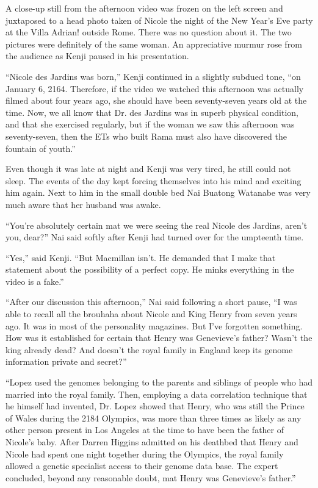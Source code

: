 \documentclass[]{article}
\begin{document}
{A close-up still from the afternoon video was frozen on the left screen and juxtaposed to a head photo taken of Nicole the night of the New Year’s Eve party at the Villa Adrian! outside Rome.  There was no question about it.  The two pictures were definitely of the same woman.  An appreciative murmur rose from the audience as Kenji paused in his presentation.

“Nicole des Jardins was born,” Kenji continued in a slightly subdued tone, “on January 6, 2164.  Therefore, if the video we watched this afternoon was actually filmed about four years ago, she should have been seventy-seven years old at the time.  Now, we all know that Dr.  des Jardins was in superb physical condition, and that she exercised regularly, but if the woman we saw this afternoon was seventy-seven, then the ETs who built Rama must also have discovered the fountain of youth.”

Even though it was late at night and Kenji was very tired, he still could not sleep.  The events of the day kept forcing themselves into his mind and exciting him again.  Next to him in the small double bed Nai Buatong Watanabe was very much aware that her husband was awake.

“You’re absolutely certain mat we were seeing the real Nicole des Jardins, aren’t you, dear?” Nai said softly after Kenji had turned over for the umpteenth time.

“Yes,” said Kenji.  “But Macmillan isn’t.  He demanded that I make that statement about the possibility of a perfect copy.  He minks everything in the video is a fake.”

“After our discussion this afternoon,” Nai said following a short pause, “I was able to recall all the brouhaha about Nicole and King Henry from seven years ago.  It was in most of the personality magazines.  But I’ve forgotten something.  How was it established for certain that Henry was Genevieve’s father? Wasn’t the king already dead? And doesn’t the royal family in England keep its genome information private and secret?”

“Lopez used the genomes belonging to the parents and siblings of people who had married into the royal family.  Then, employing a data correlation technique that he himself had invented, Dr.  Lopez showed that Henry, who was still the Prince of Wales during the 2184 Olympics, was more than three times as likely as any other person present in Los Angeles at the time to have been the father of Nicole’s baby.  After Darren Higgins admitted on his deathbed that Henry and Nicole had spent one night together during the Olympics, the royal family allowed a genetic specialist access to their genome data base.  The expert concluded, beyond any reasonable doubt, mat Henry was Genevieve’s father.”

}
\end{document}

